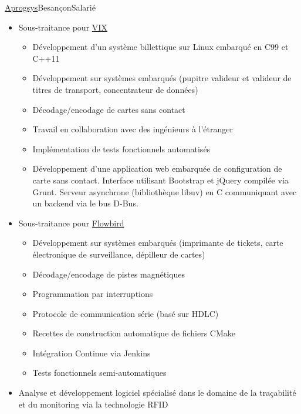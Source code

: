 \documentclass[11pt,a4paper,sans,french]{moderncv}
\begin{document}
{\href{https://www.aprogsys.com/}{Aprogsys}}{Besançon}{Salarié}{%
 \begin{itemize}
  \item Sous-traitance pour \href{http://vixtechnology.com/}{VIX}
        \begin{itemize}
         \item Développement d'un système billettique sur Linux embarqué
               en C99 et C++11
         \item Développement sur systèmes embarqués (pupitre valideur et
               valideur de titres de transport, concentrateur de données)
         \item Décodage/encodage de cartes sans contact
         \item Travail en collaboration avec des ingénieurs à l'étranger
         \item Implémentation de tests fonctionnels automatisés
         \item Développement d'une application web embarquée de configuration
               de carte sans contact.
               Interface utilisant Bootstrap et jQuery compilée via Grunt.
               Serveur asynchrone (bibliothèque libuv) en C communiquant avec
               un backend via le bus D-Bus.
        \end{itemize}
  \item Sous-traitance pour \href{http://flowbird.group/}{Flowbird}
        \begin{itemize}
         \item Développement sur systèmes embarqués (imprimante de tickets,
               carte électronique de surveillance, dépilleur de cartes)
         \item Décodage/encodage de pistes magnétiques
         \item Programmation par interruptions
         \item Protocole de communication série (basé sur HDLC)
         \item Recettes de construction automatique de fichiers CMake
         \item Intégration Continue via Jenkins
         \item Tests fonctionnels semi-automatiques
        \end{itemize}
  \item Analyse et développement logiciel spécialisé dans le domaine
        de la traçabilité et du monitoring via la technologie RFID
        \begin{itemize}

\end{itemize}
\end{itemize}}
\end{document}
